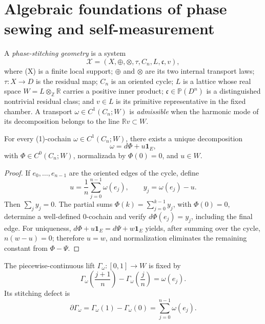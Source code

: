 \providecommand{\X}{\mathcal X}
\providecommand{\Acal}{\mathfrak a}
\providecommand{\bd}{\partial}
\providecommand{\oneE}{\mathbf 1_E}

\section{Algebraic foundations of phase sewing and self-measurement}

\begin{definition}
A \emph{phase-stitching
geometry} is a system
\[
\X=(X,\oplus,\otimes,\tau,C_n,L,\mathfrak c,v),
\]
where (X) is a finite local support; \(\oplus\) and \(\otimes\) are its
two internal transport laws; \(\tau:X\to D\) is the residual map;
\(C_n\) is an oriented cycle; \(L\) is a lattice whose real space
\(W=L\otimes_{\mathbb Z}\mathbb R\) carries a positive inner product;
\(\mathfrak c\in\mathbb P(D^n)\) is a distinguished nontrivial residual
class; and \(v\in L\) is its primitive representative in the fixed chamber.
A transport \(\omega\in C^1(C_n;W)\) is \emph{admissible} when the harmonic
mode of its decomposition belongs to the line
\(\mathbb Rv\subset W\).
\end{definition}

\begin{theorem}
\label{thm:hodge-cycle}
For every (1)-cochain \(\omega\in C^1(C_n;W)\), there exists a unique
decomposition
\[
  \omega=d\Phi+u\oneE,
\]
with \(\Phi\in C^0(C_n;W)\), normalizada by \(\Phi(0)=0\), and \(u\in W\).
\end{theorem}

\begin{proof}
If \(e_0,\ldots,e_{n-1}\) are the oriented edges of the cycle, define
\[
 u=\frac1n\sum_{j=0}^{n-1}\omega(e_j),
 \qquad y_j=\omega(e_j)-u.
\]
Then \(\sum_jy_j=0\). The partial sums
\(\Phi(k)=\sum_{j=0}^{k-1}y_j\), with \(\Phi(0)=0\), determine a
well-defined 0-cochain and verify \(d\Phi(e_j)=y_j\), including the
final edge. For uniqueness,
\(d\Phi+u\oneE=d\Psi+w\oneE\) yields, after summing over the cycle,
\(n(w-u)=0\); therefore \(u=w\), and normalization eliminates the
remaining constant from \(\Phi-\Psi\).
\end{proof}

\begin{definition}
The piecewise-continuous lift \(\Gamma_\omega:[0,1]\to W\) is fixed by
\[
 \Gamma_\omega\!\left(\frac{j+1}{n}\right)
 -\Gamma_\omega\!\left(\frac jn\right)=\omega(e_j).
\]
Its stitching defect is
\[
 \bd\Gamma_\omega
 =\Gamma_\omega(1)-\Gamma_\omega(0)
 =\sum_{j=0}^{n-1}\omega(e_j).
\]
\end{definition}

